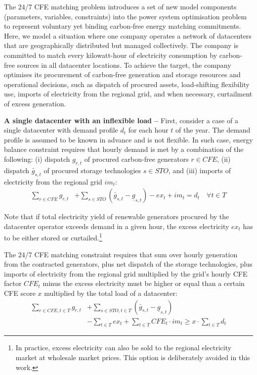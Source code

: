 
The 24/7 CFE matching problem introduces a set of new model components (parameters, variables, constraints) into the power system optimisation problem to represent voluntary yet binding carbon-free energy matching commitments. Here, we model a situation where one company operates a network of datacenters that are geographically distributed but managed collectively. The company is committed to match every kilowatt-hour of electricity consumption by carbon-free sources in all datacenter locations. To achieve the target, the company optimises its procurement of carbon-free generation and storage resources and operational decisions, such as dispatch of procured assets, load-shifting flexibility use, imports of electricity from the regional grid, and when necessary, curtailment of excess generation.

\textbf{A single datacenter with an inflexible load --} First, consider a case of a single datacenter with demand profile $d_{t}$ for each hour $t$ of the year. The demand profile is assumed to be known in advance and is not flexible. In such case, energy balance constraint requires that hourly demand is met by a combination of the following: (i) dispatch $g_{r,t}$ of procured carbon-free generators $r\in CFE$, (ii) dispatch $\bar{g}_{s,t}$ of procured storage technologies $s\in STO$, and (iii) imports of electricity from the regional grid $im_{t}$:
\begin{equation}
    \begin{split}
        \sum_{r\in CFE} g_{r,t} &+ \sum_{s\in STO} \left(\bar{g}_{s,t} - \underline{g}_{s,t}\right) - ex_t + im_t = d_t \quad \forall t \in T
    \end{split}
\label{eqn:inflexnb}
\end{equation}

Note that if total electricity yield of renewable generators procured by the datacenter operator exceeds demand in a given hour, the excess electricity $ex_t$ has to be either stored or curtailed.\footnote{In practice, excess electricity can also be sold to the regional electricity market at wholesale market prices. This option is deliberately avoided in this work.}

The 24/7 CFE matching constraint requires that sum over hourly generation from the contracted generators, plus net dispatch of the storage technologies, plus imports of electricity from the regional grid multiplied by the grid's hourly CFE factor $CFE_t$ minus the excess electricity must be higher or equal than a certain CFE score $x$ multiplied by the total load of a datacenter:
\begin{equation}
    \begin{split}
        \sum_{r\in CFE, t\in T} g_{r,t} &+ \sum_{s\in STO, t\in T} \left(\bar{g}_{s,t} - \underline{g}_{s,t}\right) \\
        &- \sum_{t\in T} ex_t + \sum_{t\in T} CFE_t \cdot im_t \geq x \cdot \sum_{t\in T} d_t
    \end{split}
\label{eqn:CFE}
\end{equation}

